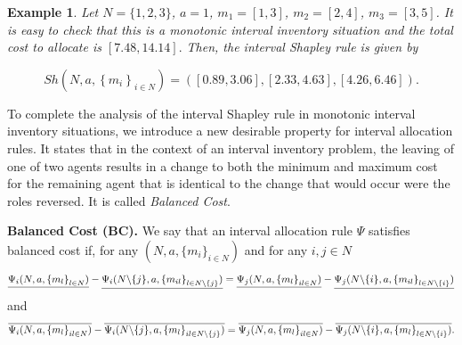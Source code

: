 \documentclass[12pt]{article}
\newtheorem{ex}{\sc Example}[section]
\begin{document}
\begin{ex}
Let $N=\{1,2,3\}$, $a=1$, $m_{1}=[1,3]$, $m_{2}=[2,4]$, $m_{3}=[3,5]$. It is easy to check that this is a monotonic interval inventory situation and the total cost to allocate is $[7.48,14.14].$  Then, the interval Shapley rule is given by 


\begin{equation*}
Sh\left(N,a,\left\{ m_{i}\right\} _{i\in N}\right)=\left(
[0.89,3.06],[2.33,4.63],[4.26,6.46]\right) .
\end{equation*}
\end{ex}


To complete the analysis of the interval Shapley rule in monotonic interval inventory situations, we introduce a new desirable property for interval allocation rules. It states that in the context of an interval inventory problem, the leaving of one of two agents results in a change to both the minimum and maximum cost for the remaining agent that is identical to the change that would occur were the roles reversed. It is called \textit{Balanced Cost}.


\textbf{Balanced Cost (BC).} We say that an interval allocation rule $\Psi$ satisfies balanced cost if, for any $(N,a,\{m_{i}\}_{i \in N})$ and for any $i,j \in N$
\begin{equation*}
\underline{\Psi_{i}(N,a,\left\{ m_{l}\right\} _{l\in N})} -\underline{%
\Psi_{i}(N\backslash\{j\},a,\left\{ m_{il}\right\} _{l\in N\backslash\{j\}})}
=\underline{\Psi_{j}(N,a,\left\{ m_{l}\right\} _{il\in N})} -\underline{%
\Psi_{j}(N\backslash\{i\},a,\left\{ m_{il}\right\} _{l\in N\backslash\{i\}})}
\end{equation*}%
and 
\begin{equation*}
\overline{\Psi_{i}(N,a,\left\{ m_{l}\right\} _{il\in N})} -\overline{%
\Psi_{i}(N\backslash\{j\},a,\left\{ m_{l}\right\} _{il\in N\backslash\{j\}})}
=\overline{\Psi_{j}(N,a,\left\{ m_{l}\right\} _{il\in N})} -\overline{%
\Psi_{j}(N\backslash\{i\},a,\left\{ m_{l}\right\} _{l\in N\backslash\{i\}})}.
\end{equation*}
\end{document}
